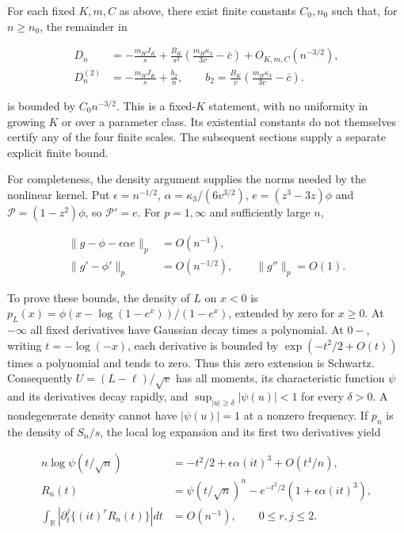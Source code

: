 \documentclass{article}
\begin{document}
For each fixed \(K,m,C\) as above, there exist finite constants
\(C_0,n_0\) such that, for \(n\ge n_0\), the remainder in

\[
\begin{aligned}
D_n&=-\frac{m_HJ_K}{s}
+\frac{B_K}{s^2}\left(\frac{m_H\kappa_3}{3v}-\bar c\right)
+O_{K,m,C}(n^{-3/2}),\\
D_n^{(2)}&=-\frac{m_HJ_K}{s}+\frac{b_2}{n},\qquad
b_2=\frac{B_K}{v}\left(\frac{m_H\kappa_3}{3v}-\bar c\right).
\end{aligned}
\tag{C.22}
\]

is bounded by \(C_0n^{-3/2}\). This is a fixed-\(K\) statement, with no
uniformity in growing \(K\) or over a parameter class. Its existential
constants do not themselves certify any of the four finite scales. The
subsequent sections supply a separate explicit finite bound.

For completeness, the density argument supplies the norms needed by the
nonlinear kernel. Put \(\epsilon=n^{-1/2}\),
\(\alpha=\kappa_3/(6v^{3/2})\), \(e=(z^3-3z)\phi\) and
\(\mathcal P=(1-z^2)\phi\), so \(\mathcal P'=e\). For \(p=1,\infty\) and
sufficiently large \(n\),

\[
\begin{aligned}
\|g-\phi-\epsilon\alpha e\|_p&=O(n^{-1}),\\
\|g'-\phi'\|_p&=O(n^{-1/2}),\qquad \|g''\|_p=O(1).
\end{aligned}
\tag{C.23}
\]

To prove these bounds, the density of \(L\) on \(x<0\) is
\(p_L(x)=\phi(x-\log(1-e^x))/(1-e^x)\), extended by zero for \(x\ge0\).
At \(-\infty\) all fixed derivatives have Gaussian decay times a
polynomial. At \(0-\), writing \(t=-\log(-x)\), each derivative is
bounded by \(\exp(-t^2/2+O(t))\) times a polynomial and tends to zero.
Thus this zero extension is Schwartz. Consequently
\(U=(L-\ell)/\sqrt v\) has all moments, its characteristic function
\(\psi\) and its derivatives decay rapidly, and
\(\sup_{|u|\ge\delta}|\psi(u)|<1\) for every \(\delta>0\). A
nondegenerate density cannot have \(|\psi(u)|=1\) at a nonzero
frequency. If \(p_n\) is the density of \(S_n/s\), the local log
expansion and its first two derivatives yield

\[
\begin{aligned}
n\log\psi(t/\sqrt n)&=-t^2/2+\epsilon\alpha(it)^3+O(t^4/n),\\
R_n(t)&=\psi(t/\sqrt n)^n-e^{-t^2/2}(1+\epsilon\alpha(it)^3),\\
\int_{\mathbb R}\left|\partial_t^j\{(it)^rR_n(t)\}\right|dt
&=O(n^{-1}),\qquad 0\le r,j\le2.
\end{aligned}
\tag{C.24}
\]
\end{document}
